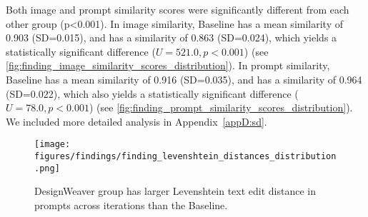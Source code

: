 
Both image and prompt similarity scores were significantly different from each other group (p<0.001). In image similarity, Baseline has a mean similarity of 0.903 (SD=0.015), and \toolname{} has a similarity of 0.863 (SD=0.024), which yields a statistically significant difference ($U=521.0, p<0.001$) (see \autoref{fig:finding_image_similarity_scores_distribution}). In prompt similarity, Baseline has a mean similarity of 0.916 (SD=0.035), and \toolname{} has a similarity of 0.964 (SD=0.022), which also yields a statistically significant difference ($U=78.0, p<0.001$) (see \autoref{fig:finding_prompt_similarity_scores_distribution}). We included more detailed analysis in Appendix~\ref{appD:sd}.

\begin{figure}[htbp]
    \centering
    \texttt{[image: figures/findings/finding\_levenshtein\_distances\_distribution.png]}
    \caption{DesignWeaver group has larger Levenshtein text edit distance in prompts across iterations than the Baseline.}
    \label{fig:finding_levenshtein_distances_distribution}
\end{figure}

